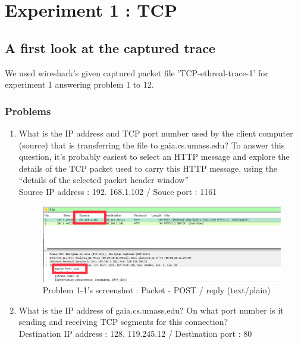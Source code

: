 \section{Experiment 1 : TCP}
\subsection{A first look at the captured trace}
    We used wireshark's given captured packet file 'TCP-ethreal-trace-1' for experiment 1 answering problem 1 to 12.
    \subsubsection*{Problems}
    \begin{enumerate}[label=\bfseries Problem \arabic*:,leftmargin=*,labelindent=1em]
        \item What is the IP address and TCP port number used by the client computer (source) that is transferring the file to gaia.cs.umass.edu?
        To answer this question, it’s probably easiest to select an HTTP message and explore the details of the TCP packet used to carry this HTTP message, using the “details of the selected packet header window”\\[0.2mm]
        \soln Source IP address : 192. 168.1.102  /  Souce port : 1161
        \begin{figure}[!h]\centering
        \hspace{15mm}
    		\includegraphics[width=.85\textwidth]{image/week02/1-1-1.png}
    		\caption{\footnotesize Problem 1-1's screenshot : Packet - POST / reply (text/plain)}
    		\vspace{-10pt}
        \end{figure}
        \item What is the IP address of gaia.cs.umass.edu? On what port number is it sending and receiving TCP segments for this connection?\\[0.2mm]
        \soln Destination IP address : 128. 119.245.12  /  Destination port : 80

\end{enumerate}

